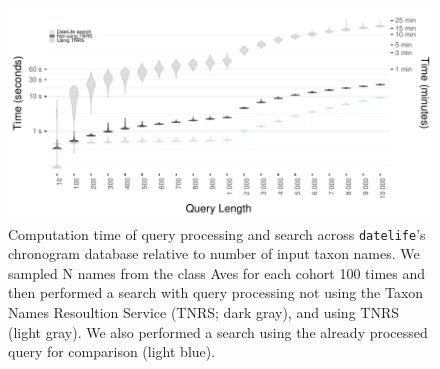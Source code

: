 \documentclass[
  english,
  man]{apa6}
\begin{document}
\begin{figure}[!h]
\includegraphics[width=1\linewidth]{../figures/fig_runtime_main.pdf}
\caption{Computation time of query processing and search across \texttt{datelife}'s chronogram database relative to number of input taxon names. We sampled N names from the class Aves for each cohort 100 times and then performed a search with query processing not using the Taxon Names Resoultion Service (TNRS; dark gray), and using TNRS (light gray). We also performed a search using the already processed query for comparison (light blue).}
\label{fig:runtime_main}
\end{figure}
\end{document}

